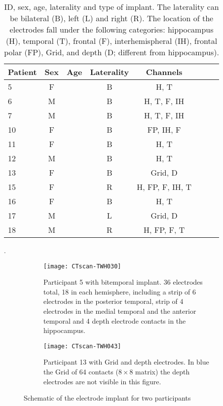 \documentclass[11pt, onecolumn]{article}
\begin{document}
\begin{table}
\centering
\begin{tabular}{l*{6}{c}r}
Patient & Sex & Age & Laterality & Channels  \\
\hline
5 & F &  & B & H, T \\
6 & M &  & B & H, T, F, IH \\
7 & M &  & B & H, T, F, IH \\
10 & F &  & B & FP, IH, F  \\
11 & F &  & B & H, T \\
12 & M &  & B & H, T  \\ %
13 & F &  & B & Grid, D \\%
15 & F &  & R & H, FP, F, IH, T   \\
16 & F &  & B & H, T  \\
17 & M &  & L & Grid, D \\ %
18 & M &  & R & H, FP, F, T   \\
\end{tabular}
\caption{\label{Table:demog} ID, sex, age, laterality and type of implant. 
The laterality can be bilateral (B), left (L) and right (R). The location of the electrodes fall under the following categories: hippocampus (H), temporal (T), frontal (F),  interhemispheral (IH), frontal  polar (FP),  Grid, and depth  (D; different from hippocampus).}.
\end{table}

\begin{figure}[H] 
  \begin{subfigure}[t]{0.5\linewidth}
    \centering
    \texttt{[image: CTscan-TWH030]} 
    \caption{Participant 5 with bitemporal implant. 36 electrodes total, 18 in each hemisphere, including a strip of 6 electrodes in the posterior temporal, strip of 4 electrodes in the medial temporal and the anterior temporal and 4 depth electrode contacts in the hippocampus.} 
    \label{fig0:a} 
    \vspace{4ex}
  \end{subfigure}%
  \hspace{1ex}
  \begin{subfigure}[t]{0.5\linewidth}
    \centering
    \texttt{[image: CTscan-TWH043]} 
    \caption{Participant 13 with Grid and depth electrodes. In blue the Grid of 64 contacts ($8 \times 8$ matrix) the depth electrodes are not visible in this figure.} 
    \label{fig0:b} 
    \vspace{4ex}
  \end{subfigure} 
  \caption{Schematic of the electrode implant for two participants}
  \label{fig0} 
\end{figure}
\end{document}
